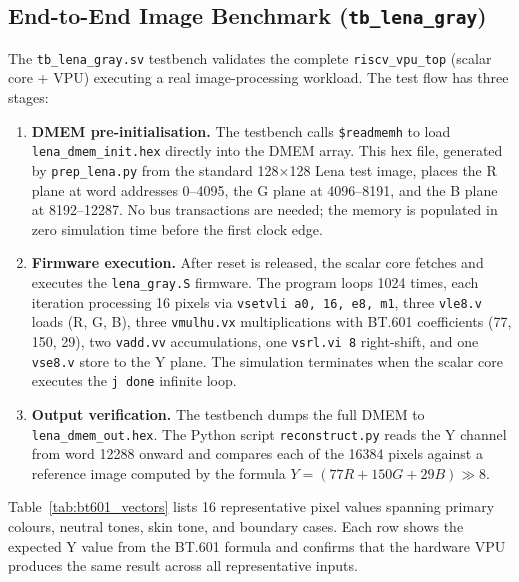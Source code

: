 \subsection{End-to-End Image Benchmark (\texttt{tb\_lena\_gray})}

The \texttt{tb\_lena\_gray.sv} testbench validates the complete \texttt{riscv\_vpu\_top}
(scalar core + VPU) executing a real image-processing workload. The test flow has three
stages:

\begin{enumerate}
  \item \textbf{DMEM pre-initialisation.} The testbench calls \texttt{\$readmemh} to
        load \texttt{lena\_dmem\_init.hex} directly into the DMEM array. This hex file,
        generated by \texttt{prep\_lena.py} from the standard 128$\times$128 Lena test
        image, places the R plane at word addresses 0--4095, the G plane at 4096--8191,
        and the B plane at 8192--12287. No bus transactions are needed; the memory is
        populated in zero simulation time before the first clock edge.

  \item \textbf{Firmware execution.} After reset is released, the scalar core fetches and
        executes the \texttt{lena\_gray.S} firmware. The program loops 1024 times, each
        iteration processing 16 pixels via \texttt{vsetvli~a0,~16,~e8,~m1}, three
        \texttt{vle8.v} loads (R, G, B), three \texttt{vmulhu.vx} multiplications with
        BT.601 coefficients (77, 150, 29), two \texttt{vadd.vv} accumulations, one
        \texttt{vsrl.vi~8} right-shift, and one \texttt{vse8.v} store to the Y plane.
        The simulation terminates when the scalar core executes the \texttt{j~done}
        infinite loop.

  \item \textbf{Output verification.} The testbench dumps the full DMEM to
        \texttt{lena\_dmem\_out.hex}. The Python script \texttt{reconstruct.py} reads the
        Y channel from word 12288 onward and compares each of the 16384 pixels against a
        reference image computed by the formula $Y = (77 R + 150 G + 29 B) \gg 8$.
\end{enumerate}

Table~\ref{tab:bt601_vectors} lists 16 representative pixel values spanning primary
colours, neutral tones, skin tone, and boundary cases. Each row shows the expected Y
value from the BT.601 formula and confirms that the hardware VPU produces the same
result across all representative inputs.

